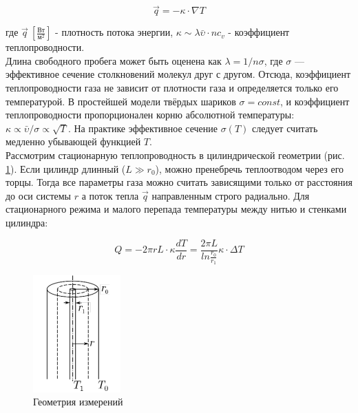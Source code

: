 \documentclass[a4paper, 12pt]{article}
\begin{document}
    \begin{equation}
        \overrightarrow{q}=-\kappa\cdot \nabla T
    \end{equation}

    \noindent где $\overrightarrow{q} \: [\frac{\text{Вт}}{\text{м}^2}]$ - плотность потока энергии, $\kappa \sim \lambda\bar{\upsilon}\cdot n c_v$ - коэффициент теплопроводности.\\

    \noindent Длина свободного пробега может быть оценена как $\lambda = 1/n \sigma$, где $\sigma$ — эффективное сечение столкновений молекул друг с другом. Отсюда, коэффициент теплопроводности газа не зависит от плотности газа и определяется только его температурой. В простейшей модели твёрдых шариков $\sigma = const$, и коэффициент теплопроводности пропорционален корню абсолютной температуры: $\kappa \propto \bar{\upsilon} / \sigma \propto \sqrt{T}$. На практике эффективное сечение $\sigma(T)$ следует считать медленно убывающей функцией $T$.\\
    
    \noindent Рассмотрим стационарную теплопроводность в цилиндрической геометрии (рис. \ref{Цилиндр}). Если цилиндр длинный ($L \gg r_0$), можно пренебречь теплоотводом через его торцы. Тогда все параметры газа можно считать зависящими только от расстояния до оси системы $r$ а поток тепла $\overrightarrow{q}$ направленным строго радиально. Для стационарного режима и малого перепада температуры между нитью и стенками цилиндра:
    
    \begin{equation}
        Q = -2\pi r L\cdot \kappa \frac{dT}{dr}=\frac{2\pi L}{ln\frac{r_0}{r_1}}\kappa\cdot \Delta T
        \label{formula}
    \end{equation}

    \begin{figure}[H]
        \centering
        \includegraphics[width=0.3\textwidth]{images/cylinder.png}
        \caption{Геометрия измерений} 
        \label{Цилиндр}
    \end{figure}
\end{document}
